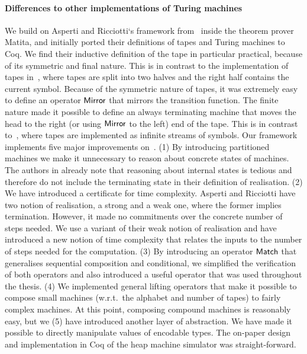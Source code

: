 \paragraph{Differences to other implementations of Turing machines}
We build on Asperti and Ricciotti`s framework from~\cite{asperti2015} inside the theorem prover Matita, and initially ported their definitions of
tapes and Turing machines to Coq.  We find their inductive definition of the tape in particular practical, because of its symmetric and final nature.
This is in contrast to the implementation of tapes in~\cite{Xu:2013:MTM:2529315.2529331}, where tapes are split into two halves and the right half
contains the current symbol.  Because of the symmetric nature of tapes, it was extremely easy to define an operator $\mathsf{Mirror}$ that mirrors the
transition function.  The finite nature made it possible to define an always terminating machine that moves the head to the right (or using
$\mathsf{Mirror}$ to the left) end of the tape.  This is in contrast to~\cite{Ciaffaglione:2016:TTC:2956213.2956306}, where tapes are implemented as
infinite streams of symbols.  Our framework implements five major improvements on~\cite{asperti2015}.  (1) By introducing partitioned machines we make
it unnecessary to reason about concrete states of machines.  The authors in \cite{asperti2015} already note that reasoning about internal states is
tedious and therefore do not include the terminating state in their definition of realisation.  (2) We have introduced a certificate for time
complexity.  Asperti and Ricciotti have two notion of realisation, a strong and a weak one, where the former implies termination.  However, it made no
commitments over the concrete number of steps needed.  We use a variant of their weak notion of realisation and have introduced a new notion of time
complexity that relates the inputs to the number of steps needed for the computation.  (3) By introducing an operator $\mathsf{Match}$ that generalises
sequential composition and conditional, we simplified the verification of both operators and also introduced a useful operator that was used
throughout the thesis.  (4) We implemented general lifting operators that make it possible to compose small machines (w.r.t.\ the alphabet and number
of tapes) to fairly complex machines.  At this point, composing compound machines is reasonably easy, but we (5) have introduced another layer of
abstraction.  We have made it possible to directly manipulate values of encodable types.  The on-paper design and implementation in Coq of the heap
machine simulator was straight-forward.


